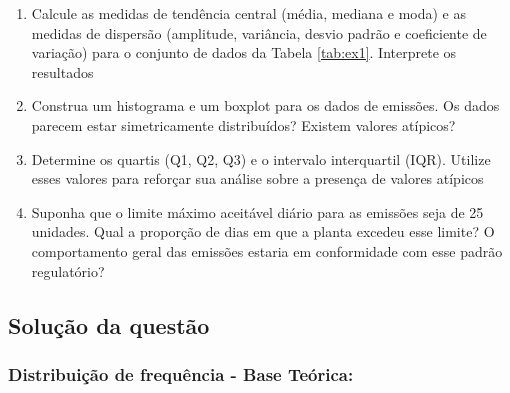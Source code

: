 \documentclass[a4paper,11pt]{article}
\begin{document}
\begin{enumerate}[leftmargin=*]
\item Calcule as medidas de tendência central (média, mediana e moda) e as medidas de
dispersão (amplitude, variância, desvio padrão e coeficiente de variação) para o conjunto de dados da Tabela \ref{tab:ex1}.  Interprete os resultados

\item Construa um histograma e um boxplot para os dados de emissões. Os dados parecem
estar simetricamente distribuídos? Existem valores atípicos?

\item Determine os quartis (Q1, Q2, Q3) e o intervalo interquartil (IQR). Utilize esses valores
para reforçar sua análise sobre a presença de valores atípicos

\item Suponha que o limite máximo aceitável diário para as emissões seja de 25 unidades.
Qual a proporção de dias em que a planta excedeu esse limite? O comportamento
geral das emissões estaria em conformidade com esse padrão regulatório? 

\end{enumerate} 


\subsection*{Solução da questão} 					

\subsubsection*{Distribuição de frequência - Base Teórica:} 
\end{document}
